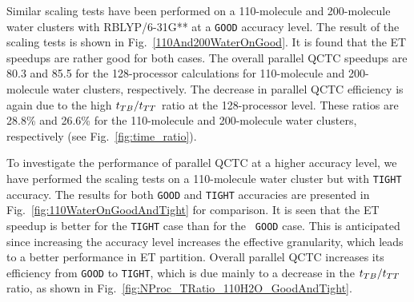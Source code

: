 \commentoutA{\documentclass[prl,aps,twocolumn,twocolumngrid,superbib]{revtex4}}
\begin{document}

Similar scaling tests have been performed on a 110-molecule and
200-molecule water clusters with RBLYP/6-31G** at a {\tt GOOD}
accuracy level.  The result of the scaling tests is shown in
Fig.~\ref{110And200WaterOnGood}. It is found that the ET speedups are
rather good for both cases. The overall parallel QCTC speedups are
80.3 and 85.5 for the 128-processor calculations for 110-molecule and
200-molecule water clusters, respectively.
The decrease in parallel QCTC efficiency is again due to the
high $t_{TB}/t_{TT}$ ratio at the 128-processor level. These ratios are
28.8\% and 26.6\% for the 110-molecule and 200-molecule water
clusters, respectively (see Fig.~\ref{fig:time_ratio}).

To investigate the performance of parallel QCTC at a higher accuracy
level, we have performed the scaling tests on a 110-molecule water
cluster but with {\tt TIGHT} accuracy\cite{CTymczak04a}. The results for both {\tt GOOD}
and {\tt TIGHT} accuracies are presented in
Fig.~\ref{fig:110WaterOnGoodAndTight} for comparison.  It is seen that
the ET speedup is better for the {\tt TIGHT} case than for the {\tt
GOOD} case. This is anticipated since increasing the accuracy level
increases the effective granularity, which leads to a better
performance in ET partition\cite{CGan03}.  Overall parallel QCTC
increases its efficiency from {\tt GOOD} to {\tt TIGHT}, which is due
mainly to a decrease in the $t_{TB}/t_{TT}$ ratio, as shown in
Fig.~\ref{fig:NProc_TRatio_110H2O_GoodAndTight}.
\end{document}
